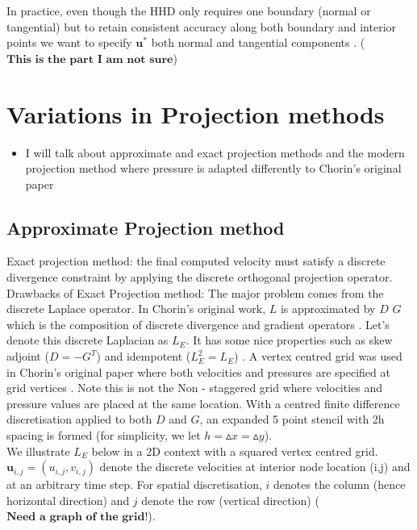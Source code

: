 In practice, even though the HHD only requires one boundary (normal or tangential) but to retain consistent accuracy along both boundary and interior points we want to specify $\textbf{u}^*$ both normal and tangential components \cite{brown2001accurate}. ($\textbf{This is the part I am not sure}$)\\


\newpage
\section{Variations in Projection methods}
\begin{itemize}
\item I will talk about approximate and exact projection methods and the modern projection method where pressure is adapted differently to Chorin's original paper\\
\end{itemize}
\subsection{Approximate Projection method}

Exact projection method: the final computed velocity must satisfy a discrete divergence constraint by applying the discrete orthogonal projection operator.\\
Drawbacks of Exact Projection method:
The major problem comes from the discrete Laplace operator. In Chorin's original work, $\textit{L}$ is approximated by $\textit{D G}$ which is the composition of discrete divergence and gradient operators \cite{chorin1968numerical,almgren1996numerical}. Let's denote this discrete Laplacian as $\textit{L}_E$. It has some nice properties such as skew adjoint ($\textit{D} = -\textit{G}^T$) and idempotent ($\textit{L}_E^2 = \textit{L}_E$) \cite{almgren1996numerical,almgren2000approximate}. A vertex centred grid was used in Chorin's original paper where both velocities and pressures are specified at grid vertices \cite{chorin1968numerical,almgren1996numerical,almgren2000approximate}. Note this is not the Non - staggered grid where velocities and pressure values are placed at the same location. With a centred finite difference discretisation applied to both $\textit{D}$ and $\textit{G}$, an expanded 5 point stencil with 2h spacing is formed (for simplicity, we let $h = \vartriangle x = \vartriangle y$).\\

We illustrate $\textit{L}_E$ below in a 2D context with a squared vertex centred grid.\\
$\textbf{u}_{i,j} = (u_{i,j}, v_{i,j})$ denote the discrete velocities at interior node location (i,j) and at an arbitrary time step. For spatial discretisation, $\textit{i}$ denotes the column (hence horizontal direction) and $\textit{j}$ denote the row (vertical direction) ($\textbf{Need a graph of the grid!}$).\\


